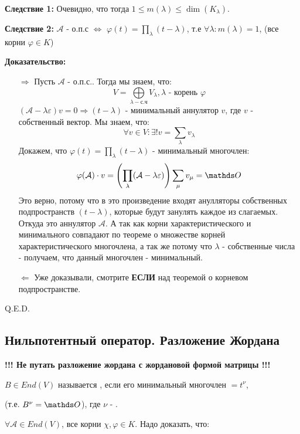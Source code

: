 \textbf{Следствие 1:} Очевидно, что тогда $1 \leq m(\lambda) \leq \dim (K_{\lambda}) $.

\textbf{Следствие 2:} $\mathcal{A}$ - о.п.с $\Leftrightarrow$ $\varphi(t) = \prod\limits_{\lambda}(t-\lambda)$, т.е $\forall \lambda: m(\lambda) =1$, (все корни $\varphi \in K$)

\textbf{Доказательство:}
\begin{enumerate}
    \item[$\Rightarrow$] Пусть $\mathcal{A}$ - о.п.с.. Тогда мы знаем, что:
    $$V = \bigoplus\limits_{\lambda - \text{с.ч}}V_\lambda, \lambda \text{ - корень } \varphi$$
    $(\mathcal{A}-\lambda \varepsilon)v = 0 \Rightarrow (t-\lambda)$ - минимальный аннулятор $v$, где $v$ - собственный вектор. Мы знаем, что:
    $$\forall v \in V: \exists! v=\sum\limits_{\lambda}v_{\lambda}$$
    Докажем, что  $\varphi(t) = \prod\limits_{\lambda}(t-\lambda)$ - минимальный многочлен:
    $$\varphi(\mathcal{A})\cdot v =\left(\prod\limits_{\lambda}(\mathcal{A}-\lambda \varepsilon)\right)\sum\limits_{\mu}v_{\mu}  = \zero$$
    Это верно, потому что в это произведение входят анулляторы собственных подпространств $(t-\lambda)$, которые будут занулять каждое из слагаемых. Откуда это аннулятор $\mathcal{A}$. А так как корни характеристического и минимального совпадают по  теореме о множестве корней характеристического многочлена, а так же потому что $\lambda$ - собственные числа - получаем, что данный многочлен - минимальный.

    \item[$\Leftarrow$] Уже доказывали, смотрите \textbf{ЕСЛИ} над теоремой о корневом подпространстве.
\end{enumerate}
 \hfill Q.E.D.




\pagebreak


\subsection{Нильпотентный оператор. Разложение Жордана }

\textbf{!!! Не путать разложение жордана с жордановой формой матрицы !!!}

 $B \in End(V)$ называется , если его минимальный многочлен $ = t^\nu$,

(т.е. $B^\nu = \zero$), где $\nu$ - .



$\forall \mathcal{A}\in End(V)$, все корни $\chi,\varphi \in K$. Надо доказать, что:

